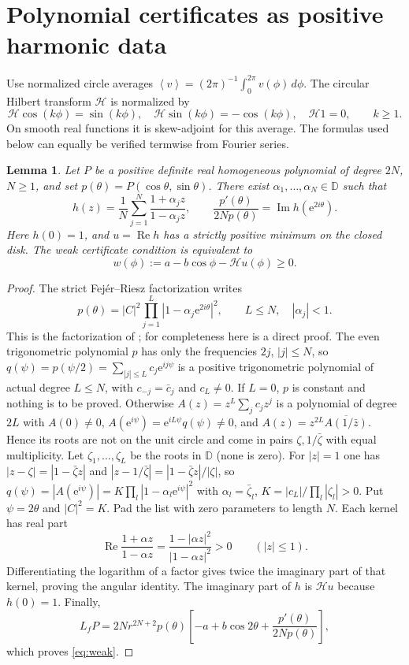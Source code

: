\documentclass[11pt]{article}
\newtheorem{lemma}[theorem]{Lemma}
\theoremstyle{remark}\newtheorem{remark}[theorem]{Remark}
\newcommand{\D}{\mathbb D}
\newcommand{\Rea}{\operatorname{Re}}
\newcommand{\Ima}{\operatorname{Im}}
\newcommand{\avg}[1]{\left\langle #1\right\rangle}
\newcommand{\ee}{\mathrm e}
\begin{document}
\section{Polynomial certificates as positive harmonic data}
Use normalized circle averages
\(\avg v=(2\pi)^{-1}\int_0^{2\pi}v(\phi)\,d\phi\).
The circular Hilbert transform \(\mathcal H\) is normalized by
\[
 \mathcal H\cos(k\phi)=\sin(k\phi),\quad
 \mathcal H\sin(k\phi)=-\cos(k\phi),\quad
 \mathcal H1=0,\qquad k\ge1.
\]
On smooth real functions it is skew-adjoint for this average.
The formulas used below can equally be verified termwise from
Fourier series.

\begin{lemma}\label{lem:harmonic}
Let \(P\) be a positive definite real homogeneous polynomial of
degree \(2N\), \(N\ge1\), and set
\(p(\theta)=P(\cos\theta,\sin\theta)\).
There exist \(\alpha_1,\ldots,\alpha_N\in\D\) such that
\[
 h(z)=\frac1N\sum_{j=1}^N\frac{1+\alpha_jz}{1-\alpha_jz},
 \qquad
 \frac{p'(\theta)}{2Np(\theta)}
       =\Ima h(\ee^{2i\theta}).
\]
Here \(h(0)=1\), and \(u=\Rea h\) has a strictly positive minimum
on the closed disk. The weak certificate condition is equivalent to
\begin{equation}\label{eq:weak}
 w(\phi):=a-b\cos\phi-\mathcal Hu(\phi)\ge0.
\end{equation}
\end{lemma}
\begin{proof}
The strict Fej\'er--Riesz factorization writes
\[
 p(\theta)=|C|^2\prod_{j=1}^L
        |1-\alpha_j\ee^{2i\theta}|^2,
 \qquad L\le N,\quad |\alpha_j|<1.
\]
This is the factorization of \cite[Lemma III.2 and proof of
Lemma III.3]{liu}; for completeness here is a direct proof.
The even trigonometric polynomial \(p\) has only the frequencies
\(2j\), \(|j|\le N\), so \(q(\psi)=p(\psi/2)=\sum_{|j|\le L}c_j\ee^{ij\psi}\)
is a positive trigonometric polynomial of actual degree \(L\le N\),
with \(c_{-j}=\bar c_j\) and \(c_L\ne0\). If \(L=0\), \(p\) is constant
and nothing is to be proved. Otherwise
\(A(z)=z^L\sum_jc_jz^j\) is a polynomial of degree \(2L\) with
\(A(0)\ne0\), \(A(\ee^{i\psi})=\ee^{iL\psi}q(\psi)\ne0\), and
\(A(z)=z^{2L}\overline{A(1/\bar z)}\). Hence its roots are not on
the unit circle and come in pairs \(\zeta,1/\bar\zeta\) with equal
multiplicity. Let \(\zeta_1,\dots,\zeta_L\) be the roots in \(\D\)
(none is zero). For \(|z|=1\) one has \(|z-\zeta|=|1-\bar\zeta z|\) and
\(|z-1/\bar\zeta|=|1-\bar\zeta z|/|\zeta|\), so
\(q(\psi)=|A(\ee^{i\psi})|=K\prod_l|1-\alpha_l\ee^{i\psi}|^2\) with
\(\alpha_l=\bar\zeta_l\), \(K=|c_L|/\prod_l|\zeta_l|>0\). Put
\(\psi=2\theta\) and \(|C|^2=K\).
Pad the list with zero parameters to length \(N\).
Each kernel has real part
\[
 \Rea\frac{1+\alpha z}{1-\alpha z}
       =\frac{1-|\alpha z|^2}{|1-\alpha z|^2}>0
       \qquad(|z|\le1).
\]
Differentiating the logarithm of a factor gives twice the imaginary
part of that kernel, proving the angular identity.
The imaginary part of \(h\) is \(\mathcal Hu\) because \(h(0)=1\).
Finally,
\[
 L_fP=2N r^{2N+2}p(\theta)
       \left[-a+b\cos2\theta+
              \frac{p'(\theta)}{2Np(\theta)}\right],
\]
which proves \eqref{eq:weak}.
\end{proof}
\end{document}
